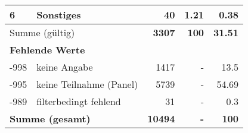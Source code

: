 \begin{longtable}{lXrrr}
     6 &
     \multicolumn{1}{X}{ Sonstiges   } &


       \num{40} &
       \num[round-mode=places,round-precision=2]{1,21} &
         \num[round-mode=places,round-precision=2]{0,38} \\
     \midrule
     \multicolumn{2}{l}{Summe (gültig)} &
       \textbf{\num{3307}} &
     \textbf{100} &
       \textbf{\num[round-mode=places,round-precision=2]{31,51}} \\
     \multicolumn{5}{l}{\textbf{Fehlende Werte}}\\
       -998 &
       keine Angabe &
         \num{1417} &
        - &
         \num[round-mode=places,round-precision=2]{13,5} \\
       -995 &
       keine Teilnahme (Panel) &
         \num{5739} &
        - &
         \num[round-mode=places,round-precision=2]{54,69} \\
       -989 &
       filterbedingt fehlend &
         \num{31} &
        - &
         \num[round-mode=places,round-precision=2]{0,3} \\
     \midrule
     \multicolumn{2}{l}{\textbf{Summe (gesamt)}} &
          \textbf{\num{10494}} &
        \textbf{-} &
        \textbf{100} \\
     \bottomrule
     \end{longtable}
     
